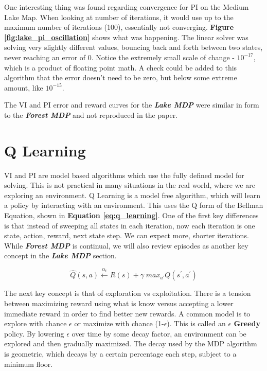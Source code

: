\documentclass[letterpaper]{article} %
\begin{document}
One interesting thing was found regarding convergence for PI on the Medium Lake Map.  When looking at number of iterations, it would use up to the maximum number of iterations (100), essentially not converging.  \textbf{Figure \ref{fig:lake_pi_oscillation}} shows what was happening.  The linear solver was solving very slightly different values, bouncing back and forth between two states, never reaching an error of 0.  Notice the extremely small scale of change - $10^{-17}$, which is a product of floating point math.  A check could be added to this algorithm that the error doesn't need to be zero, but below some extreme amount, like $10^{-15}$.

The VI and PI error and reward curves for  the \textbf{\emph{Lake MDP}} were similar in form to the \textbf{\emph{Forest MDP}} and not reproduced in the paper.

\section{Q Learning}
VI and PI are model based algorithms which use the fully defined model for solving.  This is not practical in many situations in the real world, where we are exploring an environment.  Q Learning is a model free algorithm, which will learn a policy by interacting with an environment.  This uses the Q form of the Bellman Equation, shown in \textbf{Equation \ref{eq:q_learning}}.  One of the first key differences is that instead of sweeping all states in each iteration, now each iteration is one state, action, reward, next state step.  We can expect more, shorter iterations.   While \textbf{\emph{Forest MDP}} is continual, we will also review episodes as another key concept in the \textbf{\emph{Lake MDP}} section.

\begin{equation} 
\label{eq:q_learning}
\hat{Q}(s,a) \xleftarrow{\alpha_t} R(s) + \gamma \;  max_{a^\prime} Q(s^\prime, a^\prime)
\end{equation}

The next key concept is that of exploration vs exploitation. There is a tension between maximizing reward using what is know versus accepting a lower immediate reward in order to find better new rewards.  A common model is to explore with chance $\epsilon$ or maximize with chance (1-$\epsilon$).  This is called an \textbf{$\epsilon$ Greedy} policy.  By lowering $\epsilon$ over time by some decay factor, an environment can be explored and then gradually maximized.  The decay used by the MDP algorithm is geometric, which decays by a certain percentage each step, subject to a minimum floor.
\end{document}
